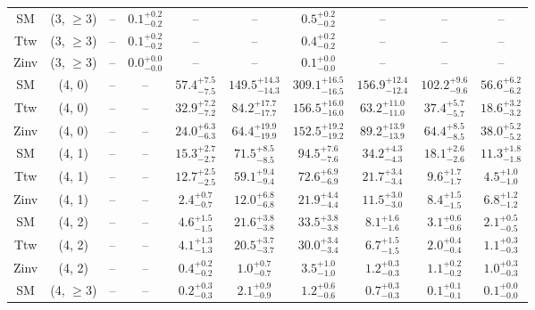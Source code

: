 \begin{table}[h!]
{\begin{tabular}{cccccccccc}
	SM & (3, $\ge3$) & -- & $0.1^{+ 0.2 }_{- 0.2 }$ & -- & -- & $0.5^{+ 0.2 }_{- 0.2 }$ & -- & -- & -- \\[0.5ex] 
	Ttw & (3, $\ge3$) & -- & $0.1^{+ 0.2 }_{- 0.2 }$ & -- & -- & $0.4^{+ 0.2 }_{- 0.2 }$ & -- & -- & -- \\[0.5ex] 
	Zinv & (3, $\ge3$) & -- & $0.0^{+ 0.0 }_{- 0.0 }$ & -- & -- & $0.1^{+ 0.0 }_{- 0.0 }$ & -- & -- & -- \\[0.5ex] 
	SM & (4, 0) & -- & -- & $57.4^{+ 7.5 }_{- 7.5 }$ & $149.5^{+ 14.3 }_{- 14.3 }$ & $309.1^{+ 16.5 }_{- 16.5 }$ & $156.9^{+ 12.4 }_{- 12.4 }$ & $102.2^{+ 9.6 }_{- 9.6 }$ & $56.6^{+ 6.2 }_{- 6.2 }$ \\[0.5ex] 
	Ttw & (4, 0) & -- & -- & $32.9^{+ 7.2 }_{- 7.2 }$ & $84.2^{+ 17.7 }_{- 17.7 }$ & $156.5^{+ 16.0 }_{- 16.0 }$ & $63.2^{+ 11.0 }_{- 11.0 }$ & $37.4^{+ 5.7 }_{- 5.7 }$ & $18.6^{+ 3.2 }_{- 3.2 }$ \\[0.5ex] 
	Zinv & (4, 0) & -- & -- & $24.0^{+ 6.3 }_{- 6.3 }$ & $64.4^{+ 19.9 }_{- 19.9 }$ & $152.5^{+ 19.2 }_{- 19.2 }$ & $89.2^{+ 13.9 }_{- 13.9 }$ & $64.4^{+ 8.5 }_{- 8.5 }$ & $38.0^{+ 5.2 }_{- 5.2 }$ \\[0.5ex] 
	SM & (4, 1) & -- & -- & $15.3^{+ 2.7 }_{- 2.7 }$ & $71.5^{+ 8.5 }_{- 8.5 }$ & $94.5^{+ 7.6 }_{- 7.6 }$ & $34.2^{+ 4.3 }_{- 4.3 }$ & $18.1^{+ 2.6 }_{- 2.6 }$ & $11.3^{+ 1.8 }_{- 1.8 }$ \\[0.5ex] 
	Ttw & (4, 1) & -- & -- & $12.7^{+ 2.5 }_{- 2.5 }$ & $59.1^{+ 9.4 }_{- 9.4 }$ & $72.6^{+ 6.9 }_{- 6.9 }$ & $21.7^{+ 3.4 }_{- 3.4 }$ & $9.6^{+ 1.7 }_{- 1.7 }$ & $4.5^{+ 1.0 }_{- 1.0 }$ \\[0.5ex] 
	Zinv & (4, 1) & -- & -- & $2.4^{+ 0.7 }_{- 0.7 }$ & $12.0^{+ 6.8 }_{- 6.8 }$ & $21.9^{+ 4.4 }_{- 4.4 }$ & $11.5^{+ 3.0 }_{- 3.0 }$ & $8.4^{+ 1.5 }_{- 1.5 }$ & $6.8^{+ 1.2 }_{- 1.2 }$ \\[0.5ex] 
	SM & (4, 2) & -- & -- & $4.6^{+ 1.5 }_{- 1.5 }$ & $21.6^{+ 3.8 }_{- 3.8 }$ & $33.5^{+ 3.8 }_{- 3.8 }$ & $8.1^{+ 1.6 }_{- 1.6 }$ & $3.1^{+ 0.6 }_{- 0.6 }$ & $2.1^{+ 0.5 }_{- 0.5 }$ \\[0.5ex] 
	Ttw & (4, 2) & -- & -- & $4.1^{+ 1.3 }_{- 1.3 }$ & $20.5^{+ 3.7 }_{- 3.7 }$ & $30.0^{+ 3.4 }_{- 3.4 }$ & $6.7^{+ 1.5 }_{- 1.5 }$ & $2.0^{+ 0.4 }_{- 0.4 }$ & $1.1^{+ 0.3 }_{- 0.3 }$ \\[0.5ex] 
	Zinv & (4, 2) & -- & -- & $0.4^{+ 0.2 }_{- 0.2 }$ & $1.0^{+ 0.7 }_{- 0.7 }$ & $3.5^{+ 1.0 }_{- 1.0 }$ & $1.2^{+ 0.3 }_{- 0.3 }$ & $1.1^{+ 0.2 }_{- 0.2 }$ & $1.0^{+ 0.3 }_{- 0.3 }$ \\[0.5ex] 
	SM & (4, $\ge3$) & -- & -- & $0.2^{+ 0.3 }_{- 0.3 }$ & $2.1^{+ 0.9 }_{- 0.9 }$ & $1.2^{+ 0.6 }_{- 0.6 }$ & $0.7^{+ 0.3 }_{- 0.3 }$ & $0.1^{+ 0.1 }_{- 0.1 }$ & $0.1^{+ 0.0 }_{- 0.0 }$ \\[0.5ex] 

\end{tabular}}
\end{table}
